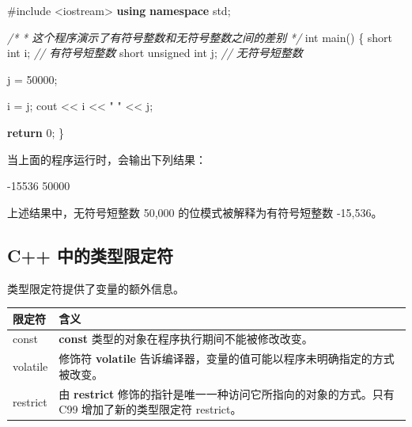 \documentclass[
]{article}
\newenvironment{Shaded}{}{}
\newcommand{\CommentTok}[1]{\textcolor[rgb]{0.38,0.63,0.69}{\textit{#1}}}
\newcommand{\ControlFlowTok}[1]{\textcolor[rgb]{0.00,0.44,0.13}{\textbf{#1}}}
\newcommand{\DataTypeTok}[1]{\textcolor[rgb]{0.56,0.13,0.00}{#1}}
\newcommand{\DecValTok}[1]{\textcolor[rgb]{0.25,0.63,0.44}{#1}}
\newcommand{\ImportTok}[1]{#1}
\newcommand{\KeywordTok}[1]{\textcolor[rgb]{0.00,0.44,0.13}{\textbf{#1}}}
\newcommand{\NormalTok}[1]{#1}
\newcommand{\OperatorTok}[1]{\textcolor[rgb]{0.40,0.40,0.40}{#1}}
\newcommand{\PreprocessorTok}[1]{\textcolor[rgb]{0.74,0.48,0.00}{#1}}
\newcommand{\StringTok}[1]{\textcolor[rgb]{0.25,0.44,0.63}{#1}}
\begin{document}
\begin{Shaded}
\begin{Highlighting}[]
\PreprocessorTok{\#include }\ImportTok{\textless{}iostream\textgreater{}}
\KeywordTok{using} \KeywordTok{namespace}\NormalTok{ std}\OperatorTok{;}
 
\CommentTok{/* }
\CommentTok{ * 这个程序演示了有符号整数和无符号整数之间的差别}
\CommentTok{*/}
\DataTypeTok{int}\NormalTok{ main}\OperatorTok{()}
\OperatorTok{\{}
   \DataTypeTok{short} \DataTypeTok{int}\NormalTok{ i}\OperatorTok{;}           \CommentTok{// 有符号短整数}
   \DataTypeTok{short} \DataTypeTok{unsigned} \DataTypeTok{int}\NormalTok{ j}\OperatorTok{;}  \CommentTok{// 无符号短整数}

\NormalTok{   j }\OperatorTok{=} \DecValTok{50000}\OperatorTok{;}

\NormalTok{   i }\OperatorTok{=}\NormalTok{ j}\OperatorTok{;}
\NormalTok{   cout }\OperatorTok{\textless{}\textless{}}\NormalTok{ i }\OperatorTok{\textless{}\textless{}} \StringTok{" "} \OperatorTok{\textless{}\textless{}}\NormalTok{ j}\OperatorTok{;}

   \ControlFlowTok{return} \DecValTok{0}\OperatorTok{;}
\OperatorTok{\}}
\end{Highlighting}
\end{Shaded}

当上面的程序运行时，会输出下列结果：

\begin{Shaded}
\begin{Highlighting}[]
\OperatorTok{{-}}\DecValTok{15536} \DecValTok{50000}
\end{Highlighting}
\end{Shaded}

上述结果中，无符号短整数 50,000 的位模式被解释为有符号短整数 -15,536。

\hypertarget{c-ux4e2dux7684ux7c7bux578bux9650ux5b9aux7b26}{%
\subsection{C++
中的类型限定符}\label{c-ux4e2dux7684ux7c7bux578bux9650ux5b9aux7b26}}

类型限定符提供了变量的额外信息。

\begin{longtable}[]{@{}ll@{}}
\toprule
限定符 & 含义 \\
\midrule
\endhead
const & \textbf{const} 类型的对象在程序执行期间不能被修改改变。 \\
volatile & 修饰符 \textbf{volatile}
告诉编译器，变量的值可能以程序未明确指定的方式被改变。 \\
restrict & 由 \textbf{restrict}
修饰的指针是唯一一种访问它所指向的对象的方式。只有 C99
增加了新的类型限定符 restrict。 \\
\bottomrule
\end{longtable}
\end{document}
